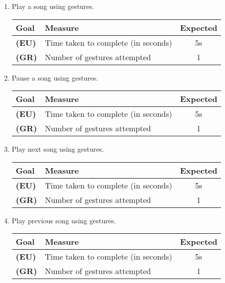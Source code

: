 \documentclass[12pt,letterpaper]{article}
\begin{document}
\begin{enumerate}

\item Play a song using gestures.
\begin{center}\begin{tabular}{l|l|c}
\textbf{Goal} & \textbf{Measure} & \textbf{Expected} \\
\hline
\textbf{(EU)} & Time taken to complete (in seconds) & 5s \\
\hline
\textbf{(GR)} & Number of gestures attempted & 1 \\
\hline
\end{tabular}\end{center}

\item Pause a song using gestures.
\begin{center}\begin{tabular}{l|l|c}
\textbf{Goal} & \textbf{Measure} & \textbf{Expected} \\
\hline
\textbf{(EU)} & Time taken to complete (in seconds) & 5s \\
\hline
\textbf{(GR)} & Number of gestures attempted & 1 \\
\hline
\end{tabular}\end{center}

\item Play next song using gestures.
\begin{center}\begin{tabular}{l|l|c}
\textbf{Goal} & \textbf{Measure} & \textbf{Expected} \\
\hline
\textbf{(EU)} & Time taken to complete (in seconds) & 5s \\
\hline
\textbf{(GR)} & Number of gestures attempted & 1 \\
\hline
\end{tabular}\end{center}

\item Play previous song using gestures.
\begin{center}\begin{tabular}{l|l|c}
\textbf{Goal} & \textbf{Measure} & \textbf{Expected} \\
\hline
\textbf{(EU)} & Time taken to complete (in seconds) & 5s \\
\hline
\textbf{(GR)} & Number of gestures attempted & 1 \\
\hline
\end{tabular}\end{center}


\end{enumerate}
\end{document}
